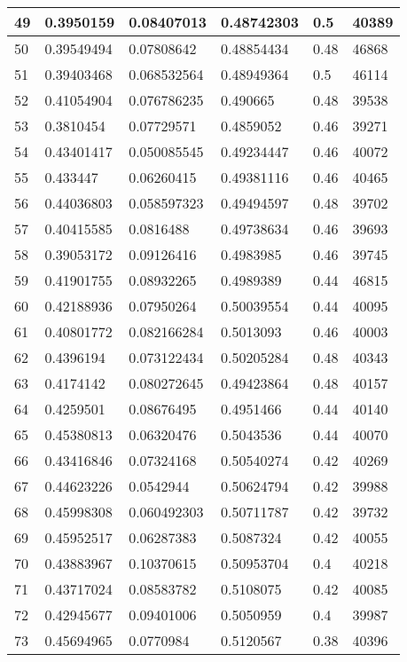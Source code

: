\begin{longtable}{|l|l|l|l|l|l|}
49 & 0.3950159 & 0.08407013 & 0.48742303 & 0.5 & 40389 \\ \hline 
50 & 0.39549494 & 0.07808642 & 0.48854434 & 0.48 & 46868 \\ \hline 
51 & 0.39403468 & 0.068532564 & 0.48949364 & 0.5 & 46114 \\ \hline 
52 & 0.41054904 & 0.076786235 & 0.490665 & 0.48 & 39538 \\ \hline 
53 & 0.3810454 & 0.07729571 & 0.4859052 & 0.46 & 39271 \\ \hline 
54 & 0.43401417 & 0.050085545 & 0.49234447 & 0.46 & 40072 \\ \hline 
55 & 0.433447 & 0.06260415 & 0.49381116 & 0.46 & 40465 \\ \hline 
56 & 0.44036803 & 0.058597323 & 0.49494597 & 0.48 & 39702 \\ \hline 
57 & 0.40415585 & 0.0816488 & 0.49738634 & 0.46 & 39693 \\ \hline 
58 & 0.39053172 & 0.09126416 & 0.4983985 & 0.46 & 39745 \\ \hline 
59 & 0.41901755 & 0.08932265 & 0.4989389 & 0.44 & 46815 \\ \hline 
60 & 0.42188936 & 0.07950264 & 0.50039554 & 0.44 & 40095 \\ \hline 
61 & 0.40801772 & 0.082166284 & 0.5013093 & 0.46 & 40003 \\ \hline 
62 & 0.4396194 & 0.073122434 & 0.50205284 & 0.48 & 40343 \\ \hline 
63 & 0.4174142 & 0.080272645 & 0.49423864 & 0.48 & 40157 \\ \hline 
64 & 0.4259501 & 0.08676495 & 0.4951466 & 0.44 & 40140 \\ \hline 
65 & 0.45380813 & 0.06320476 & 0.5043536 & 0.44 & 40070 \\ \hline 
66 & 0.43416846 & 0.07324168 & 0.50540274 & 0.42 & 40269 \\ \hline 
67 & 0.44623226 & 0.0542944 & 0.50624794 & 0.42 & 39988 \\ \hline 
68 & 0.45998308 & 0.060492303 & 0.50711787 & 0.42 & 39732 \\ \hline 
69 & 0.45952517 & 0.06287383 & 0.5087324 & 0.42 & 40055 \\ \hline 
70 & 0.43883967 & 0.10370615 & 0.50953704 & 0.4 & 40218 \\ \hline 
71 & 0.43717024 & 0.08583782 & 0.5108075 & 0.42 & 40085 \\ \hline 
72 & 0.42945677 & 0.09401006 & 0.5050959 & 0.4 & 39987 \\ \hline 
73 & 0.45694965 & 0.0770984 & 0.5120567 & 0.38 & 40396 \\ \hline 

\end{longtable}
